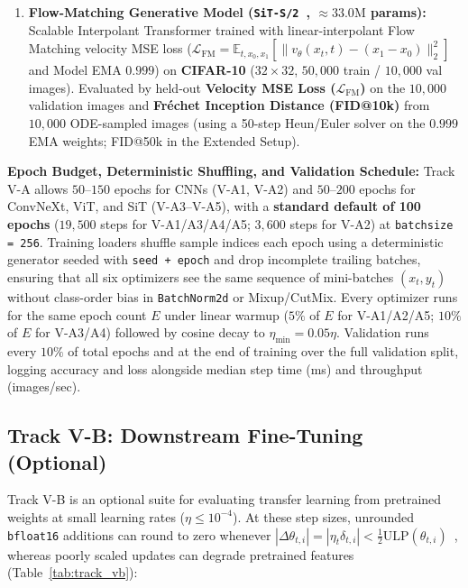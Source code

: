\documentclass[11pt,a4paper]{article}
\renewcommand{\_}{\origunderscore\allowbreak}
\begin{document}
\begin{enumerate}[label=\textbf{V-A\arabic*.}, leftmargin=3.2em, itemsep=0.45em]
    \item \textbf{Flow-Matching Generative Model (\texttt{SiT-S/2}~\cite{ma2024sit,lipman2023flow}, $\approx 33.0\text{M}$ params):} Scalable Interpolant Transformer trained with linear-interpolant Flow Matching velocity MSE loss ($\mathcal{L}_{\text{FM}} = \mathbb{E}_{t,x_0,x_1}[\|v_\theta(x_t, t) - (x_1 - x_0)\|_2^2]$ and Model EMA $0.999$) on \textbf{CIFAR-10} ($32 \times 32$, $50,000$ train / $10,000$ val images). Evaluated by held-out \textbf{Velocity MSE Loss ($\mathcal{L}_{\text{FM}}$)} on the $10,000$ validation images and \textbf{Fr\'echet Inception Distance (FID@10k)} from $10,000$ ODE-sampled images (using a 50-step Heun/Euler solver on the $0.999$ EMA weights; FID@50k in the Extended Setup).
\end{enumerate}

\noindent
\textbf{Epoch Budget, Deterministic Shuffling, and Validation Schedule:} Track V-A allows $50$--$150$ epochs for CNNs (V-A1, V-A2) and $50$--$200$ epochs for ConvNeXt, ViT, and SiT (V-A3--V-A5), with a \textbf{standard default of 100 epochs} ($19,500$ steps for V-A1/A3/A4/A5; $3,600$ steps for V-A2) at \texttt{batch\_size = 256}. Training loaders shuffle sample indices each epoch using a deterministic generator seeded with \texttt{seed + epoch} and drop incomplete trailing batches, ensuring that all six optimizers see the same sequence of mini-batches $(x_t, y_t)$ without class-order bias in \texttt{BatchNorm2d} or Mixup/CutMix. Every optimizer runs for the same epoch count $E$ under linear warmup ($5\%$ of $E$ for V-A1/A2/A5; $10\%$ of $E$ for V-A3/A4) followed by cosine decay to $\eta_{\min} = 0.05\eta$. Validation runs every $10\%$ of total epochs and at the end of training over the full validation split, logging accuracy and loss alongside median step time (ms) and throughput (images/sec).

\subsection{Track V-B: Downstream Fine-Tuning (Optional)}
\noindent
Track V-B is an optional suite for evaluating transfer learning from pretrained weights at small learning rates ($\eta \le 10^{-4}$). At these step sizes, unrounded \texttt{bfloat16} additions can round to zero whenever $|\Delta\theta_{t,i}| = |\eta_t\delta_{t,i}| < \frac{1}{2}\text{ULP}(\theta_{t,i})$~\cite{zamirai2021revisiting}, whereas poorly scaled updates can degrade pretrained features (Table~\ref{tab:track_vb}):
\end{document}
